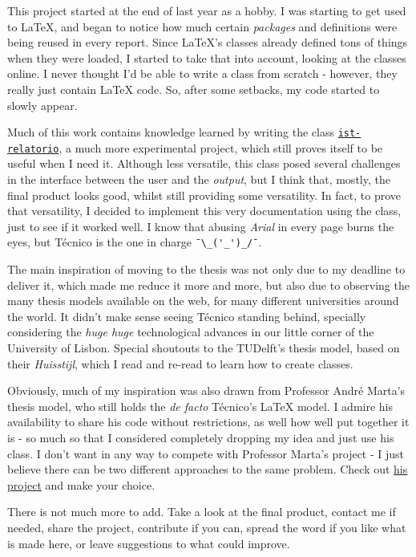 \documentclass[english]{ist-thesis}
\begin{document}
This project started at the end of last year as a hobby. I was starting to get used to \LaTeX{}, and began to notice how much certain \textit{packages} and  definitions were being reused in every report. Since \LaTeX{}'s classes already defined tons of things when they were loaded, I started to take that into account, looking at the classes online. I never thought I'd be able to write a class from scratch - however, they really just contain \LaTeX{} code. So, after some setbacks, my code started to slowly appear.


Much of this work contains knowledge learned by writing the class \href{https://github.com/ekspek/ist-relatorio}{\texttt{ist-relatorio}}, a much more experimental project, which still proves itself to be useful when I need it. Although less versatile, this class posed several challenges in the interface between the user and the \textit{output}, but I think that, mostly, the final product looks good, whilst still providing some versatility. In fact, to prove that versatility, I decided to implement this very documentation using the class, just to see if it worked well. I know that abusing \textit{Arial} in every page burns the eyes, but Técnico is the one in charge \verb|¯\_('_')_/¯|.

The main inspiration of moving to the thesis was not only due to my deadline to deliver it, which made me reduce it more and more, but also due to observing the many thesis models available on the web, for many different universities around the world. It didn't make sense seeing Técnico standing behind, specially considering the \textit{huge huge} technological advances in our little corner of the University of Lisbon. Special shoutouts to the TUDelft's thesis model, based on their \textit{Huisstijl}, which I read and re-read to learn how to create classes.

Obviously, much of my inspiration was also drawn from Professor André Marta's thesis model, who still holds the \textit{de facto} Técnico's \LaTeX{} model. I admire his availability to share his code without restrictions, as well how well put together it is - so much so that I considered completely dropping my idea and just use his class. I don't want in any way to compete with Professor Marta's project - I just believe there can be two different approaches to the same problem. Check out \href{https://fenix.tecnico.ulisboa.pt/homepage/ist31052/documentos-para-elaboracao-da-tese}{his project} and make your choice.


There is not much more to add. Take a look at the final product, contact me if needed, share the project, contribute if you can, spread the word if you like what is made here, or leave suggestions to what could improve.
\end{document}
